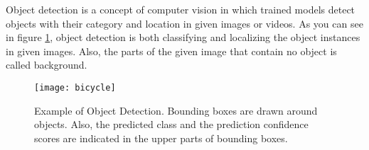 \documentclass{article}
\begin{document}
\setlength{\parindent}{6ex}

\indent

Object detection is a concept of computer vision in which trained models 
detect objects with their category and location in given images or videos. 
As you can see in figure \ref{fig:bicycle1}, object detection is both 
classifying and localizing the object instances in given images. Also, the 
parts of the given image that contain no object is called background.

\begin{figure}
    \centering
    \texttt{[image: bicycle]}
    \caption{Example of Object Detection. Bounding boxes are drawn around 
    objects. Also, the predicted class and the prediction confidence scores are 
    indicated in the upper parts of bounding boxes.}
    \label{fig:bicycle1}
\end{figure}
\end{document}

